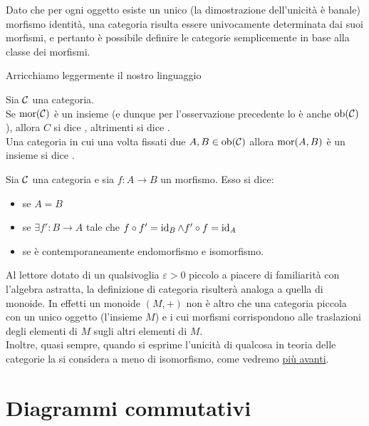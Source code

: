 \documentclass{article}
\begin{document}
\begin{observation}
    Dato che per ogni oggetto esiste un unico (la dimostrazione dell'unicità è banale) morfismo identità, una categoria risulta essere univocamente determinata dai suoi morfismi, e pertanto è possibile definire le categorie semplicemente in base alla classe dei morfismi.
\end{observation}

Arricchiamo leggermente il nostro linguaggio

\begin{definition}
    Sia $\mathcal{C}$ una categoria.\\
    Se $\operatorname{mor}(\mathcal{C})$ è un insieme (e dunque per l'osservazione precedente lo è anche $\operatorname{ob}(\mathcal{C})$), allora $C$ si dice , altrimenti si dice .\\
    Una categoria in cui una volta fissati due $A,B \in \operatorname{ob}(\mathcal{C})$ allora $\operatorname{mor}(A,B)$ è un insieme si dice .
\end{definition}

\begin{definition}
    Sia $\mathcal{C}$ una categoria e sia $f:A\to B$ un morfismo. Esso si dice:\begin{itemize}
        \item {} se $A=B$
        \item {} se $\exists f' : B\to A$ tale che $f \circ f' = \operatorname{id}_{B} \wedge f' \circ f = \operatorname{id}_{A}$
        \item {} se è contemporaneamente endomorfismo e isomorfismo.
    \end{itemize}
\end{definition}

Al lettore dotato di un qualsivoglia $\varepsilon > 0$ piccolo a piacere di familiarità con l'algebra astratta, la definizione di categoria risulterà analoga a quella di monoide. In effetti un monoide $(M,+)$ non è altro che una categoria piccola con un unico oggetto (l'insieme $M$) e i cui morfismi corrispondono alle traslazioni degli elementi di $M$ sugli altri elementi di $M$.\\ Inoltre, quasi sempre, quando si esprime l'unicità di qualcosa in teoria delle categorie la si considera a meno di isomorfismo, come vedremo \hyperref[sec:Universal]{più avanti}.

\section{Diagrammi commutativi}
\label{sec:Diagrams}
\end{document}

